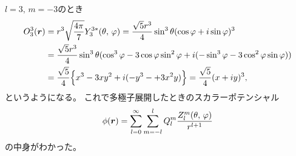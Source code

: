 \documentclass[../../master.tex]{subfiles}
\begin{document}
\(l=3,\,m=-3\)のとき
\begin{align}
    O_3^3(\vb*{r})
    &= r^3 \sqrt{\frac{4\pi}{7}} Y_3^{3*}(\theta,\,\varphi)
    = \frac{\sqrt{5}r^3}{4} \sin^3\theta (\cos\varphi+i\sin\varphi)^3\\
    &= \frac{\sqrt{5}r^3}{4} \sin^3\theta (\cos^3\varphi - 3\cos\varphi\sin^2\varphi + i(-\sin^3\varphi - 3\cos^2\varphi\sin\varphi))\\
    &= \frac{\sqrt{5}}{4} \Big\{x^3-3xy^2+i(-y^3-+3x^2y)\Big\}
    = \frac{\sqrt{5}}{4} (x+iy)^3,
\end{align}
というようになる。
これで多極子展開したときのスカラーポテンシャル
\begin{equation}
    \phi(\vb*{r}) = \sum_{l=0}^{\infty} \sum_{m=-l}^{l} Q_l^m\frac{Z_l^m(\theta,\,\varphi)}{r^{l+1}}
\end{equation}
の中身がわかった。
\end{document}
